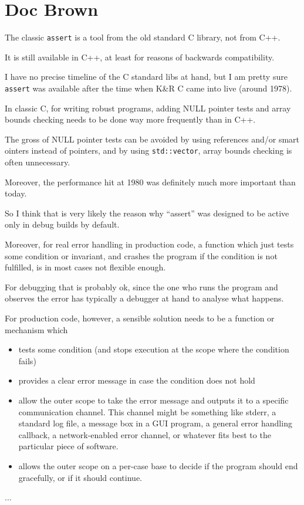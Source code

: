 \documentclass[uplatex,dvipdfmx]{jsarticle} \usepackage{amsmath,amssymb,bm}
\begin{document}
\section*{Doc Brown}
\begin{paracol}{2}
The classic {\tt assert} is a tool from the old standard C library, not from C++.

It is still available in C++, at least for reasons of backwards compatibility.
\switchcolumn
\end{paracol}
\vspace{\baselineskip}
\begin{paracol}{2}
I have no precise timeline of the C standard libs at hand, but I am pretty sure {\tt assert} was available after the time when K\&R C came into live (around 1978).

In classic C, for writing robust programs, adding NULL pointer tests and array bounds checking needs to be done way more frequently than in C++.

The gross of NULL pointer tests can be avoided by using references and/or smart ointers instead of pointers, and by using {\tt std::vector}, array bounds checking is often unnecessary.

Moreover, the performance hit at 1980 was definitely much more important than today.

So I think that is very likely the reason why ``assert'' was designed to be active only in debug builds by default.
\switchcolumn
\end{paracol}
\vspace{\baselineskip}
\begin{paracol}{2}
Moreover, for real error handling in production code, a function which just tests some condition or invariant, and crashes the program if the condition is not fulfilled, is in most cases not flexible enough.

For debugging that is probably ok, since the one who runs the program and observes the error has typically a debugger at hand to analyse what happens.

For production code, however, a sensible solution needs to be a function or mechanism which
\switchcolumn
\end{paracol}
\vspace{\baselineskip}
\begin{paracol}{2}
\begin{itemize}
\item tests some condition (and stops execution at the scope where the condition fails)
\item provides a clear error message in case the condition does not hold
\item allow the outer scope to take the error message and outputs it to a specific communication channel. This channel might be something like stderr, a standard log file, a message box in a GUI program, a general error handling callback, a network-enabled error channel, or whatever fits best to the particular piece of software.
\item allows the outer scope on a per-case base to decide if the program should end gracefully, or if it should continue.
\end{itemize}
...
\switchcolumn
\end{paracol}




\vspace{\baselineskip}
\begin{paracol}{2}
\switchcolumn
\end{paracol}
\end{document}
